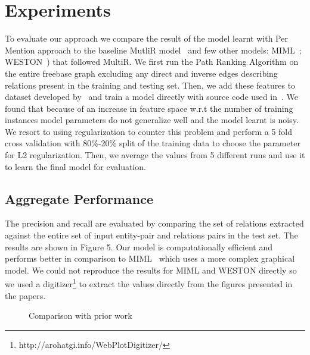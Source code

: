 \documentclass[11pt,a4paper]{article}
\begin{document}
\section{Experiments}

To evaluate our approach we compare the result of the model learnt with Per
Mention approach to the baseline MutliR
model~\cite{hoffmann-2011-distant-supervision} and few other models:
MIML~\cite{surdeanu-2012-relation-extraction};
WESTON~\cite{weston-2013-connecting-language-and-kb}) that followed MultiR. We
first run the Path Ranking Algorithm on the entire freebase graph excluding any
direct and inverse edges describing relations present in the training and
testing set. Then, we add these features to dataset developed
by~\cite{riedel-2010-distant-supervision} and train a model directly with
source code used in~\cite{hoffmann-2011-distant-supervision}. We found that
because of an increase in feature space w.r.t the number of training instances
model parameters do not generalize well and the model learnt is noisy. We
resort to using regularization to counter this problem and perform a 5 fold
cross validation with 80\%-20\% split of the training data to choose the
parameter for L2 regularization. Then, we average the values from 5 different
runs and use it to learn the final model for evaluation.


\subsection{Aggregate Performance}

The precision and recall are evaluated by comparing the set of relations
extracted against the entire set of input entity-pair and relations pairs in
the test set. The results are shown in Figure 5. Our model is computationally
efficient and performs better in comparison to
MIML~\cite{surdeanu-2012-relation-extraction} which uses a more complex
graphical model. We could not reproduce the results for MIML and WESTON
directly so we used a
digitizer\footnote{http://arohatgi.info/WebPlotDigitizer/} to extract the
values directly from the figures presented in the papers.

\begin{figure}
  \centering
  \caption{Comparison with prior work}
  \label{fig:re-prior-work}
\end{figure}
\end{document}

